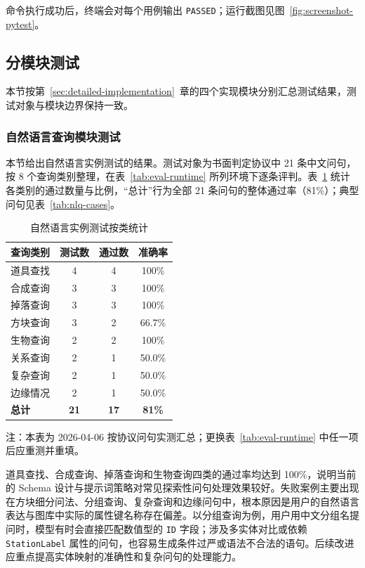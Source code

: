 \documentclass[12pt,a4paper]{article}
\begin{document}
命令执行成功后，终端会对每个用例输出 \texttt{PASSED}；运行截图见图~\ref{fig:screenshot-pytest}。

\subsection{分模块测试}

本节按第~\ref{sec:detailed-implementation}~章的四个实现模块分别汇总测试结果，测试对象与模块边界保持一致。

\subsubsection{自然语言查询模块测试}

本节给出自然语言实例测试的结果。测试对象为书面判定协议中 21 条中文问句，按 8 个查询类别整理，在表~\ref{tab:eval-runtime} 所列环境下逐条评判。表~\ref{tab:nlq-category} 统计各类别的通过数量与比例，``总计''行为全部 21 条问句的整体通过率（81\%）；典型问句见表~\ref{tab:nlq-cases}。

\begin{table}[H]
    \centering
    \captionsetup{justification=centering, singlelinecheck=false}
    \caption[自然语言实例测试按类统计]{自然语言实例测试按类统计}
    \label{tab:nlq-category}
    \begin{tabular}{lccc}
        \toprule
        \textbf{查询类别} & \textbf{测试数} & \textbf{通过数} & \textbf{准确率} \\
        \midrule
        道具查找 & 4 & 4 & 100\% \\
        合成查询 & 3 & 3 & 100\% \\
        掉落查询 & 3 & 3 & 100\% \\
        方块查询 & 3 & 2 & 66.7\% \\
        生物查询 & 2 & 2 & 100\% \\
        关系查询 & 2 & 1 & 50.0\% \\
        复杂查询 & 2 & 1 & 50.0\% \\
        边缘情况 & 2 & 1 & 50.0\% \\
        \midrule
        \textbf{总计} & \textbf{21} & \textbf{17} & \textbf{81\%} \\
        \bottomrule
    \end{tabular}
\end{table}
{\small 注：本表为 2026-04-06 按协议问句实测汇总；更换表~\ref{tab:eval-runtime} 中任一项后应重测并重填。}

道具查找、合成查询、掉落查询和生物查询四类的通过率均达到 100\%，说明当前的 Schema 设计与提示词策略对常见探索性问句处理效果较好。失败案例主要出现在方块细分问法、分组查询、复杂查询和边缘问句中，根本原因是用户的自然语言表达与图库中实际的属性键名称存在偏差。以分组查询为例，用户用中文分组名提问时，模型有时会直接匹配数值型的 \texttt{ID} 字段；涉及多实体对比或依赖 \texttt{StationLabel} 属性的问句，也容易生成条件过严或语法不合法的语句。后续改进应重点提高实体映射的准确性和复杂问句的处理能力。
\end{document}
